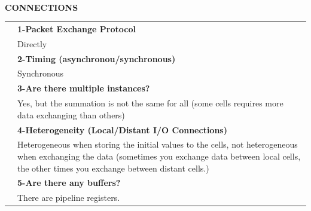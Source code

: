 \newpage{\large\textbf{ }}\vspace{10pt}\\
{\large\textbf{CONNECTIONS}}\vspace{10pt}\\\begin{tabular}{ p{0.2cm} p{14.5cm}}
&\textbf{1-Packet Exchange Protocol}\\
&Directly\vspace{7pt}\\
&\textbf{2-Timing (asynchronou/synchronous)}\\
&Synchronous\vspace{7pt}\\
&\textbf{3-Are there multiple instances? }\\
&Yes, but the summation is not the same for all (some cells requires more data exchanging than others)\vspace{7pt}\\
&\textbf{4-Heterogeneity (Local/Distant I/O Connections)}\\
&Heterogeneous when storing the initial values to the cells, not heterogeneous when exchanging the data (sometimes you exchange data between local cells, the other times you exchange between distant cells.)\vspace{7pt}\\
&\textbf{5-Are there any buffers?}\\
&There are pipeline registers.
\end{tabular}\vspace{14pt}\\
